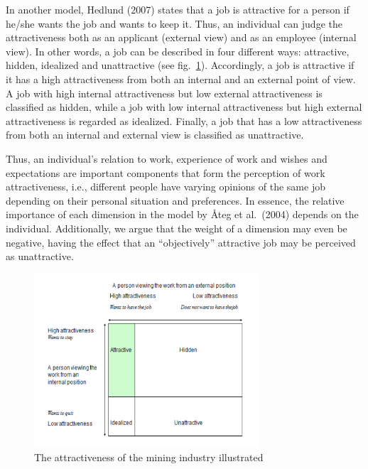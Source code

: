 \documentclass[
  12pt,
]{scrbook}
\begin{document}
In another model, Hedlund (2007) states that a job is attractive for a person if he/she wants the job and wants to keep it. Thus, an individual can judge the attractiveness both as an applicant (external view) and as an employee (internal view). In other words, a job can be described in four different ways: attractive, hidden, idealized and unattractive (see fig.~\ref{fig:figure41}). Accordingly, a job is attractive if it has a high attractiveness from both an internal and an external point of view. A job with high internal attractiveness but low external attractiveness is classified as hidden, while a job with low internal attractiveness but high external attractiveness is regarded as idealized. Finally, a job that has a low attractiveness from both an internal and external view is classified as unattractive.

Thus, an individual's relation to work, experience of work and wishes and expectations are important components that form the perception of work attractiveness, i.e., different people have varying opinions of the same job depending on their personal situation and preferences. In essence, the relative importance of each dimension in the model by Åteg et al.~(2004) depends on the individual. Additionally, we argue that the weight of a dimension may even be negative, having the effect that an ``objectively'' attractive job may be perceived as unattractive.

\begin{figure}
\hypertarget{fig:figure41}{%
\centering
\includegraphics[width=0.75\textwidth,height=\textheight]{./media/04-attracting-young-people-to-the-mining-industry/media/image1.png}
\caption{The attractiveness of the mining industry illustrated}\label{fig:figure41}
}
\end{figure}
\end{document}
